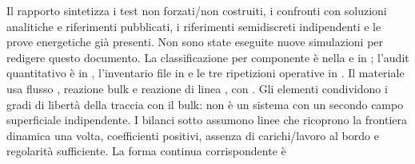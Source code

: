 \markdownRendererDocumentBegin
\markdownRendererSectionBegin
{}\markdownRendererInterblockSeparator
{} Il rapporto sintetizza i test non forzati/non costruiti, i confronti con soluzioni analitiche e riferimenti pubblicati, i riferimenti semidiscreti indipendenti e le prove energetiche già presenti. Non sono state eseguite nuove simulazioni per redigere questo documento.\markdownRendererInterblockSeparator
{}La classificazione per componente è nella  e in ; l’audit quantitativo è in , l’inventario file in  e le tre ripetizioni operative in .\markdownRendererInterblockSeparator
{}\markdownRendererSectionBegin
{}\markdownRendererInterblockSeparator
{}Il materiale  usa flusso , reazione bulk  e reazione di linea , con . Gli elementi  condividono i gradi di libertà della traccia con il bulk: non è un sistema con un secondo campo superficiale indipendente. I bilanci sotto assumono linee che ricoprono la frontiera dinamica una volta, coefficienti positivi, assenza di carichi/lavoro al bordo e regolarità sufficiente.\markdownRendererInterblockSeparator
{} La forma continua corrispondente è\markdownRendererInterblockSeparator
{}\markdownRendererInterblockSeparator
